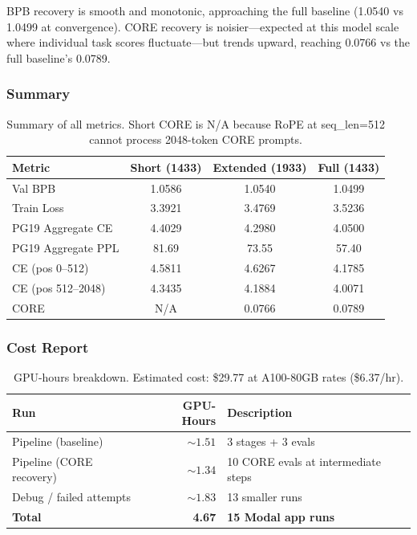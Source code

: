 \documentclass[11pt]{article}
\begin{document}
BPB recovery is smooth and monotonic, approaching the full baseline (1.0540 vs 1.0499 at convergence). CORE recovery is noisier---expected at this model scale where individual task scores fluctuate---but trends upward, reaching 0.0766 vs the full baseline's 0.0789.

\subsubsection{Summary}

\begin{table}[H]
\centering\small
\begin{tabular}{@{}lccc@{}}
\toprule
Metric & Short (1433) & Extended (1933) & Full (1433) \\
\midrule
Val BPB & 1.0586 & 1.0540 & 1.0499 \\
Train Loss & 3.3921 & 3.4769 & 3.5236 \\
PG19 Aggregate CE & 4.4029 & 4.2980 & 4.0500 \\
PG19 Aggregate PPL & 81.69 & 73.55 & 57.40 \\
CE (pos 0--512) & 4.5811 & 4.6267 & 4.1785 \\
CE (pos 512--2048) & 4.3435 & 4.1884 & 4.0071 \\
CORE & N/A & 0.0766 & 0.0789 \\
\bottomrule
\end{tabular}
\caption{Summary of all metrics. Short CORE is N/A because RoPE at seq\_len=512 cannot process 2048-token CORE prompts.}
\label{tab:summary}
\end{table}

\subsubsection{Cost Report}

\begin{table}[H]
\centering\small
\begin{tabular}{@{}lrl@{}}
\toprule
Run & GPU-Hours & Description \\
\midrule
Pipeline (baseline) & ${\sim}1.51$ & 3 stages + 3 evals \\
Pipeline (CORE recovery) & ${\sim}1.34$ & 10 CORE evals at intermediate steps \\
Debug / failed attempts & ${\sim}1.83$ & 13 smaller runs \\
\midrule
\textbf{Total} & \textbf{4.67} & \textbf{15 Modal app runs} \\
\bottomrule
\end{tabular}
\caption{GPU-hours breakdown. Estimated cost: \$29.77 at A100-80GB rates (\$6.37/hr).}
\label{tab:cost}
\end{table}
\end{document}
